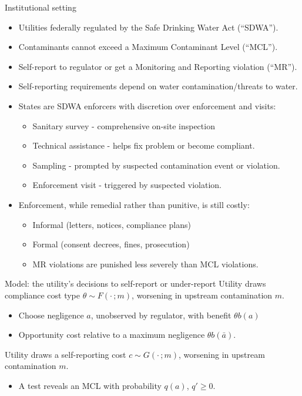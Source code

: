 \documentclass{beamer}
\begin{document}



\begin{frame}{Institutional setting}
\begin{itemize}
\item Utilities federally regulated by the Safe Drinking Water Act (``SDWA'').
\item Contaminants cannot exceed a Maximum Contaminant Level (``MCL'').
\item Self-report to regulator or get a Monitoring and Reporting violation (``MR'').
\item Self-reporting requirements depend on water contamination/threats to water.
\item States are SDWA enforcers with discretion over enforcement and visits:
\begin{itemize}
    \item Sanitary survey - comprehensive on-site inspection
    \item Technical assistance - helps fix problem or become compliant.
    \item Sampling - prompted by suspected contamination event or violation.
    \item Enforcement visit - triggered by suspected violation.
\end{itemize}

\item Enforcement, while remedial rather than punitive, is still costly:
\begin{itemize}
    \item Informal (letters, notices, compliance plans)
    \item Formal (consent decrees, fines, prosecution)
    \item MR violations are punished less severely than MCL violations.
\end{itemize}
\end{itemize}
\end{frame}




\begin{frame}{Model: the utility's decisions to self-report or under-report}
Utility draws compliance cost type $\theta \sim F(\cdot\,;m)$, worsening in upstream contamination $m$.
\begin{itemize}\small
    \item Choose negligence $a$, unobserved by regulator, with benefit $\theta b(a)$
    \item Opportunity cost relative to a maximum negligence $\theta b(\bar{a})$.
    \end{itemize}
 Utility draws a self-reporting cost $c \sim G(\cdot\,;m)$, worsening in upstream contamination $m$.
 \begin{itemize}
    \item A test reveals an MCL with probability $q(a)$, $q'\geq0$.
\end{itemize}
\end{frame}
\end{document}
